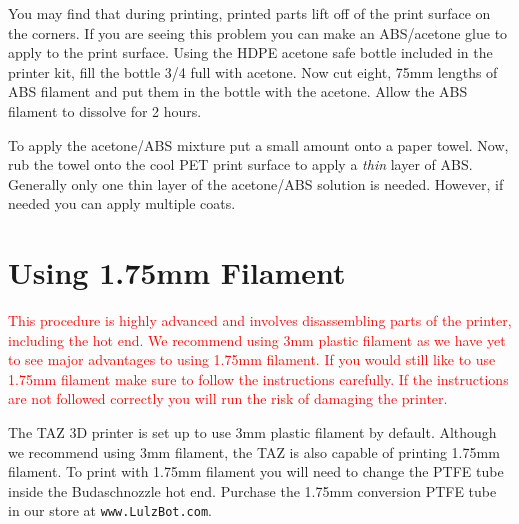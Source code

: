 You may find that during printing, printed parts lift off of the print surface on the corners. If you are seeing this problem you can make an ABS/acetone glue to apply to the print surface. Using the HDPE acetone safe bottle included in the printer kit, fill the bottle 3/4 full with acetone. Now cut eight, 75mm lengths of ABS filament and put them in the bottle with the acetone. Allow the ABS filament to dissolve for 2 hours.

To apply the acetone/ABS mixture put a small amount onto a paper towel. Now, rub the towel onto the cool PET print surface to apply a \emph{thin} layer of ABS. Generally only one thin layer of the acetone/ABS solution is needed. However, if needed you can apply multiple coats.

\section{Using 1.75mm Filament}
\textcolor{red}{This procedure is highly advanced and involves disassembling parts of the printer, including the hot end. We recommend using 3mm plastic filament as we have yet to see major advantages to using 1.75mm filament. If you would still like to use 1.75mm filament make sure to follow the instructions carefully. If the instructions are not followed correctly you will run the risk of damaging the printer.}

The TAZ 3D printer is set up to use 3mm plastic filament by default. Although we recommend using 3mm filament, the TAZ is also capable of printing 1.75mm filament. To print with 1.75mm filament you will need to change the PTFE tube inside the Budaschnozzle hot end. Purchase the 1.75mm conversion PTFE tube in our store at \texttt{www.LulzBot.com}.

